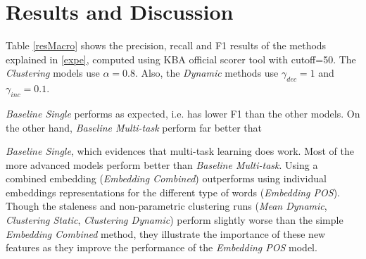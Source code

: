\documentclass{article}
\newcommand{\todo}[1]{\noindent{\textcolor{red}{\{{\bf TODO:}  #1\}}}}
\begin{document}
\section{Results and Discussion}


Table \ref{resMacro} shows the precision, recall and F1 results of the methods explained in \ref{expe}, computed using KBA official scorer tool with cutoff=50. The \textit{Clustering} models use $\alpha=0.8$. Also, the \textit{Dynamic} methods use $\gamma_{dec}=1$ and $\gamma_{inc}=0.1$.
{\textit{Baseline Single} performs as expected, i.e. has lower F1 than the other models. 
On the other hand, {\textit{Baseline Multi-task}} perform far better that {\textit{Baseline Single}, which evidences that multi-task learning does work.
Most of the more advanced models perform better than {\textit{Baseline Multi-task}}. Using a combined embedding ({\textit{Embedding Combined}}) outperforms using individual embeddings representations for the different type of words ({\textit{Embedding POS}}).
Though the staleness and non-parametric clustering runs ({\textit{Mean Dynamic}}, {\textit{Clustering Static}}, {\textit{Clustering Dynamic}}) perform slightly worse than the simple {\textit{Embedding Combined}} method, they illustrate the importance of these new features as they improve the performance of the {\textit{Embedding POS}} model.


}}
\end{document}

